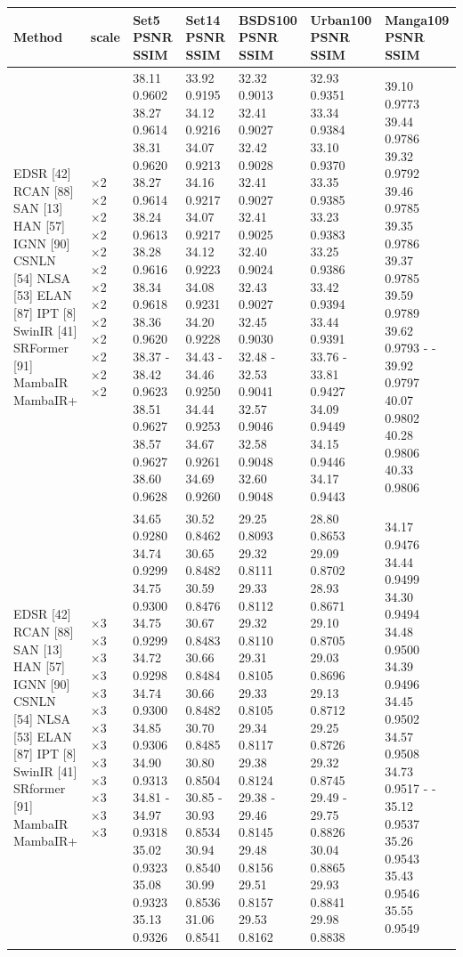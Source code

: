 \begin{tabular}{lllllll}
\toprule
Method & scale & Set5 PSNR SSIM & Set14 PSNR SSIM & BSDS100 PSNR SSIM & Urban100 PSNR SSIM & Manga109 PSNR SSIM \\
\midrule
EDSR [42] RCAN [88] SAN [13] HAN [57] IGNN [90] CSNLN [54] NLSA [53] ELAN [87] IPT [8] SwinIR [41] SRFormer [91] MambaIR MambaIR+ & ×2 ×2 ×2 ×2 ×2 ×2 ×2 ×2 ×2 ×2 ×2 ×2 ×2 & 38.11 0.9602 38.27 0.9614 38.31 0.9620 38.27 0.9614 38.24 0.9613 38.28 0.9616 38.34 0.9618 38.36 0.9620 38.37 - 38.42 0.9623 38.51 0.9627 38.57 0.9627 38.60 0.9628 & 33.92 0.9195 34.12 0.9216 34.07 0.9213 34.16 0.9217 34.07 0.9217 34.12 0.9223 34.08 0.9231 34.20 0.9228 34.43 - 34.46 0.9250 34.44 0.9253 34.67 0.9261 34.69 0.9260 & 32.32 0.9013 32.41 0.9027 32.42 0.9028 32.41 0.9027 32.41 0.9025 32.40 0.9024 32.43 0.9027 32.45 0.9030 32.48 - 32.53 0.9041 32.57 0.9046 32.58 0.9048 32.60 0.9048 & 32.93 0.9351 33.34 0.9384 33.10 0.9370 33.35 0.9385 33.23 0.9383 33.25 0.9386 33.42 0.9394 33.44 0.9391 33.76 - 33.81 0.9427 34.09 0.9449 34.15 0.9446 34.17 0.9443 & 39.10 0.9773 39.44 0.9786 39.32 0.9792 39.46 0.9785 39.35 0.9786 39.37 0.9785 39.59 0.9789 39.62 0.9793 - - 39.92 0.9797 40.07 0.9802 40.28 0.9806 40.33 0.9806 \\
EDSR [42] RCAN [88] SAN [13] HAN [57] IGNN [90] CSNLN [54] NLSA [53] ELAN [87] IPT [8] SwinIR [41] SRformer [91] MambaIR MambaIR+ & ×3 ×3 ×3 ×3 ×3 ×3 ×3 ×3 ×3 ×3 ×3 ×3 ×3 & 34.65 0.9280 34.74 0.9299 34.75 0.9300 34.75 0.9299 34.72 0.9298 34.74 0.9300 34.85 0.9306 34.90 0.9313 34.81 - 34.97 0.9318 35.02 0.9323 35.08 0.9323 35.13 0.9326 & 30.52 0.8462 30.65 0.8482 30.59 0.8476 30.67 0.8483 30.66 0.8484 30.66 0.8482 30.70 0.8485 30.80 0.8504 30.85 - 30.93 0.8534 30.94 0.8540 30.99 0.8536 31.06 0.8541 & 29.25 0.8093 29.32 0.8111 29.33 0.8112 29.32 0.8110 29.31 0.8105 29.33 0.8105 29.34 0.8117 29.38 0.8124 29.38 - 29.46 0.8145 29.48 0.8156 29.51 0.8157 29.53 0.8162 & 28.80 0.8653 29.09 0.8702 28.93 0.8671 29.10 0.8705 29.03 0.8696 29.13 0.8712 29.25 0.8726 29.32 0.8745 29.49 - 29.75 0.8826 30.04 0.8865 29.93 0.8841 29.98 0.8838 & 34.17 0.9476 34.44 0.9499 34.30 0.9494 34.48 0.9500 34.39 0.9496 34.45 0.9502 34.57 0.9508 34.73 0.9517 - - 35.12 0.9537 35.26 0.9543 35.43 0.9546 35.55 0.9549 \\

\end{tabular}
